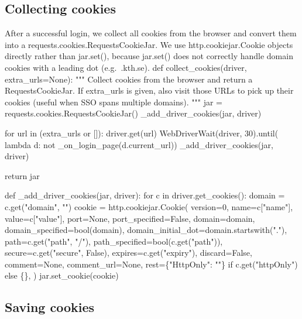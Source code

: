 \subsection{Collecting cookies}

After a successful login, we collect all cookies from the browser and
convert them into a {\Tt{}requests.cookies.RequestsCookieJar\nwendquote}.
We use {\Tt{}http.cookiejar.Cookie\nwendquote} objects directly rather than
{\Tt{}jar.set()\nwendquote}, because {\Tt{}jar.set()\nwendquote} does not correctly handle domain
cookies with a leading dot (e.g.\ {\Tt{}.kth.se\nwendquote}).
\nwenddocs{}\endmoddef\nwstartdeflinemarkup{}\nwenddeflinemarkup
def collect_cookies(driver, extra_urls=None):
  """
  Collect cookies from the browser and return a RequestsCookieJar.
  If extra_urls is given, also visit those URLs to pick up their cookies
  (useful when SSO spans multiple domains).
  """
  jar = requests.cookies.RequestsCookieJar()
  _add_driver_cookies(jar, driver)

  for url in (extra_urls or []):
    driver.get(url)
    WebDriverWait(driver, 30).until(
      lambda d: not _on_login_page(d.current_url))
    _add_driver_cookies(jar, driver)

  return jar

def _add_driver_cookies(jar, driver):
  for c in driver.get_cookies():
    domain = c.get("domain", "")
    cookie = http.cookiejar.Cookie(
      version=0,
      name=c["name"],
      value=c["value"],
      port=None, port_specified=False,
      domain=domain,
      domain_specified=bool(domain),
      domain_initial_dot=domain.startswith("."),
      path=c.get("path", "/"),
      path_specified=bool(c.get("path")),
      secure=c.get("secure", False),
      expires=c.get("expiry"),
      discard=False,
      comment=None, comment_url=None,
      rest=\{"HttpOnly": ""\} if c.get("httpOnly") else \{\},
    )
    jar.set_cookie(cookie)
\nwendcode{}\nwdocspar

\subsection{Saving cookies}

